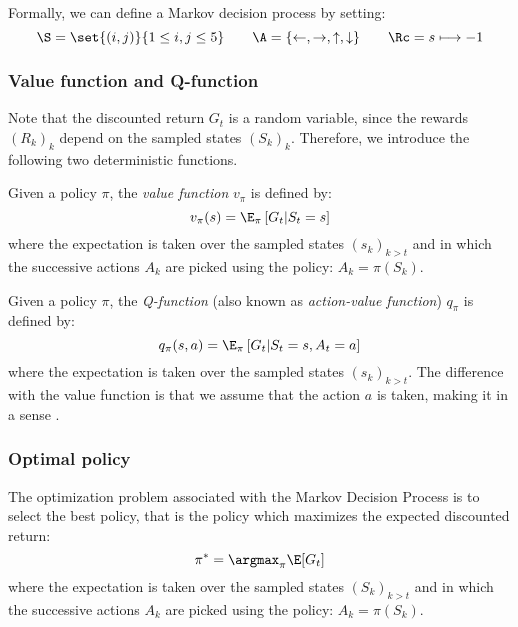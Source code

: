 Formally, we can define a Markov decision process by setting:
\begin{equation*}
    \S=\set{(i,j)}{1\leq i,j\leq5} \qquad \A=\{\leftarrow,\rightarrow,\uparrow,\downarrow\} \qquad \Rc=s\longmapsto-1
\end{equation*}


\subsubsection{Value function and Q-function}
Note that the discounted return $G_t$ is a random variable, since the rewards $(R_k)_k$ depend on the sampled states $(S_k)_k$. 
Therefore, we introduce the following two deterministic functions.

\begin{definition}
    Given a policy $\pi$, the \emph{value function} $v_\pi$ is defined by:
    \begin{equation*}
        v_\pi(s) = \E_\pi\left[G_t|S_t=s\right]
    \end{equation*}
    where the expectation is taken over the sampled states $(s_k)_{k>t}$ and in which the successive actions $A_k$ are picked using the policy: $A_k=\pi(S_k)$.
\end{definition}

\begin{definition}[Q-function]
    Given a policy $\pi$, the \emph{Q-function} (also known as \emph{action-value function}) $q_\pi$ is defined by:
    \begin{equation*}
        q_\pi(s, a) = \E_\pi\left[G_t|S_t=s, A_t=a\right]
    \end{equation*}
    where the expectation is taken over the sampled states $(s_k)_{k>t}$. The difference with the value function is that we assume that the action $a$ is taken, making it in a sense .
\end{definition}

\subsubsection{Optimal policy}
The optimization problem associated with the Markov Decision Process is to select the best policy, that is the policy which maximizes the expected discounted return:
\begin{equation}
    \pi^*=\argmax_\pi \E[G_t]
\end{equation}
where the expectation is taken over the sampled states $(S_k)_{k>t}$ and in which the successive actions $A_k$ are picked using the policy: $A_k=\pi(S_k)$.

